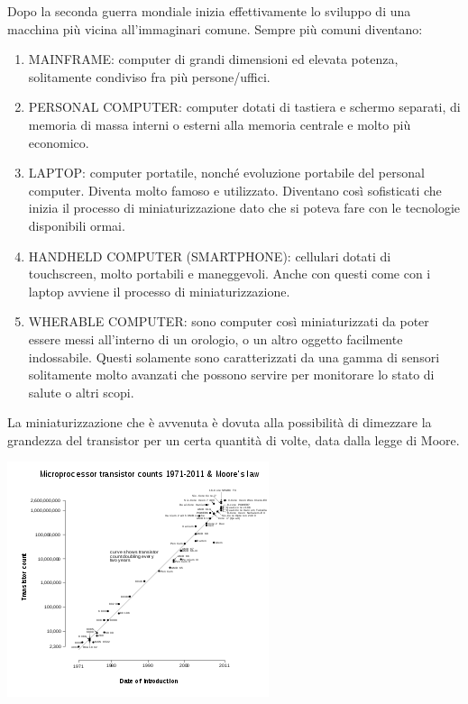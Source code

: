 \documentclass[
  paper=a4,
  oneside  ,captions=tableheading
]{scrbook}
\providecommand{\tightlist}{%
  \setlength{\itemsep}{0pt}\setlength{\parskip}{0pt}}
\begin{document}
Dopo la seconda guerra mondiale inizia effettivamente lo sviluppo di una
macchina più vicina all'immaginari comune. Sempre più comuni diventano:

\begin{enumerate}
\def\labelenumi{\arabic{enumi}.}
\tightlist
\item
  MAINFRAME: computer di grandi dimensioni ed elevata potenza,
  solitamente condiviso fra più persone/uffici.
\item
  PERSONAL COMPUTER: computer dotati di tastiera e schermo separati, di
  memoria di massa interni o esterni alla memoria centrale e molto più
  economico.
\item
  LAPTOP: computer portatile, nonché evoluzione portabile del personal
  computer. Diventa molto famoso e utilizzato. Diventano così
  sofisticati che inizia il processo di miniaturizzazione dato che si
  poteva fare con le tecnologie disponibili ormai.
\item
  HANDHELD COMPUTER (SMARTPHONE): cellulari dotati di touchscreen, molto
  portabili e maneggevoli. Anche con questi come con i laptop avviene il
  processo di miniaturizzazione.
\item
  WHERABLE COMPUTER: sono computer così miniaturizzati da poter essere
  messi all'interno di un orologio, o un altro oggetto facilmente
  indossabile. Questi solamente sono caratterizzati da una gamma di
  sensori solitamente molto avanzati che possono servire per monitorare
  lo stato di salute o altri scopi.
\end{enumerate}

La miniaturizzazione che è avvenuta è dovuta alla possibilità di
dimezzare la grandezza del transistor per un certa quantità di volte,
data dalla legge di Moore.

\includegraphics{./image/290px-Transistor_Count_and_Moore's_Law_-_2011.svg.png}
\end{document}
